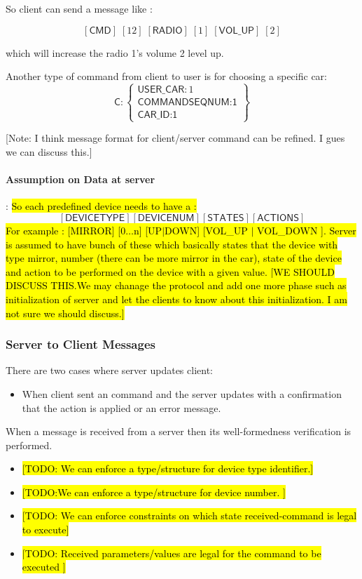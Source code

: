 So client can send a message like :

\[ [\textsf{CMD}]\;[12]\;[\textsf{RADIO}]\;[1]\;[\textsf{VOL\_UP}]\;[2]\]

which will increase the radio 1's volume 2 level up.

Another type of command from client to user is for choosing a specific car:
\[
\textsf{C}:\left\{ \begin{array}{ll}  \textsf{USER\_CAR}:1\\
                                      \textsf{COMMANDSEQNUM:1}\\
                                      \textsf{CAR\_ID:1}

           \end{array} \right\}
\]                                        


[Note: I think message format for client/server command can be refined. I gues we can discuss this.]


\paragraph{Assumption on Data at server}:  \hl{So each predefined device needs to have a :}
\[  [\textsf{DEVICETYPE}] [\textsf{DEVICENUM}] [\textsf{STATES}] [\textsf{ACTIONS}]\]
\hl{
For example : [MIRROR] [0$\ldots$n] [UP$\mid$DOWN] [VOL\_UP $\mid$ VOL\_DOWN ]. Server is assumed to have bunch of these which basically states that the device with type mirror, number (there can be more mirror in the car), state of the device and action to be performed on the device with a given value. [WE SHOULD DISCUSS THIS.We may chanage the protocol and add one more phase such as  initialization of server and let the clients to know about this initialization. I am not sure we should discuss.]}

\subsubsection{Server to Client Messages}
\label{sec:pdus:pdu:s_to_c}
There are two cases where server updates client:
\begin{itemize}
\item When client sent an command and the server updates with a confirmation that the action is applied or an error message.
  \end{itemize}

When a message is received from a server then its well-formedness verification is performed.
\begin{itemize}
\item \hl{[TODO: We can enforce a type/structure for device type identifier.]}
\item \hl{[TODO:We can enforce a type/structure for device number. ]}
\item \hl{[TODO: We can enforce constraints on which state received-command is legal to execute]}
  \item \hl{[TODO: Received parameters/values are legal for the command to be executed ]}
\end{itemize}

